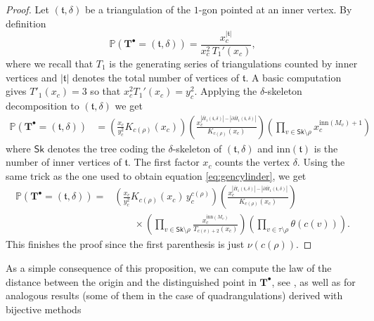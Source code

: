 \documentclass[AHL,XML,longabstracts,Unicode,NoSaveZebib]{cedram}
\begin{document}
\begin{proof}
Let $(\mathfrak t , \delta)$ be a triangulation of the $1$-gon pointed at an inner vertex. By definition
\[
\mathbb P \left( \mathbf{T}^{\bullet} = (\mathfrak t , \delta) \right) = \frac{x_c^{|\mathfrak t|}}{x_c^2 \, T_1'(x_c)},
\]
where we recall that $T_1$ is the generating series of triangulations counted by inner vertices and $| \mathfrak{t}|$ denotes the total number of vertices of $ \mathfrak{t}$. A basic computation gives $T'_{1}(x_{c})=3$ so that $x_c^2 T_1'(x_c) = y_c^2$. Applying the $\delta$-skeleton decomposition to $(\mathfrak t,\delta)$ we get
\begin{align*}
\mathbb P \left( \mathbf{T}^{\bullet} = (\mathfrak t , \delta) \right) & = \left( \frac{x_c}{y_c^2} K_{c(\rho)}(x_c)\right) \left( \frac{x_c^{|\overline H_1(\mathfrak{t}, \delta)|-|\partial \overline H_1(\mathfrak{t}, \delta)|}}{K_{c(\rho)}(x_c)}\right) \left( \prod_{v \in  \mathsf{Sk} \setminus \rho} x_c^{ \mathrm{inn}(M_v)+1}\right)
\end{align*}
where $ \mathsf{Sk}$ denotes the tree coding the $\delta$-skeleton of $ (\mathfrak{t}, \delta)$ and $ \mathrm{inn}( \mathfrak{t})$ is the number of inner vertices of $ \mathfrak{t}$. The first factor $x_c$ counts the vertex $\delta$. Using the same trick as the one used to obtain equation \eqref{eq:gencylinder}, we get
\begin{align*}
\mathbb P \left( \mathbf{T}^{\bullet} = (\mathfrak t , \delta) \right) = & \left( \frac{x_c}{y_c^2} K_{c(\rho)}(x_c) \, y_c^{c(\rho)}\right) \left( \frac{x_c^{|\overline H_1(\mathfrak{t}, \delta)|-|\partial \overline H_1(\mathfrak{t}, \delta)|}}{K_{c(\rho)}(x_c)}\right) \\
& \qquad \times \left( \prod_{v \in  \mathsf{Sk} \setminus \rho} \frac{x_c^{ \mathrm{inn}(M_v)}}{T_{c(v)+2}(x_c)}\right) \left( \prod_{v \in \tau \setminus \rho} \theta(c(v))\right).
\end{align*}
This finishes the proof since the first parenthesis is just $\nu(c(\rho))$.
\end{proof}

As a simple consequence of this proposition, we can compute the law of the distance between the origin and the distinguished point in $ \mathbf{T}^{\bullet}$, see \cite{BDFG03,DF05}, \cite[Proposition 2.4]{CD06} as well as \cite[Section 6.1]{BG12} for analogous results (some of them in the case of quadrangulations) derived with bijective methods
\end{document}
